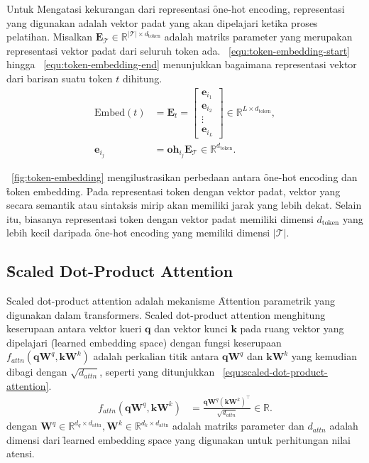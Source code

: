 	Untuk Mengatasi kekurangan dari representasi \f{one-hot encoding}, representasi yang digunakan adalah vektor padat yang akan dipelajari ketika proses pelatihan. Misalkan $\mathbf{E}_{\mathcal{T}} \in \mathbb{R}^{|\mathcal{T}| \times d_{\text{token}}}$ adalah matriks parameter yang merupakan representasi vektor padat dari seluruh token ada. \equ~\ref{equ:token-embedding-start} hingga \equ~\ref{equ:token-embedding-end} menunjukkan bagaimana representasi vektor dari barisan suatu token $t$ dihitung. 
	\begin{align}
		\label{equ:token-embedding-start}
		\text{Embed}(t) &= \mathbf{E}_{t} = \begin{bmatrix}
			\mathbf{e}_{i_1} \\
			\mathbf{e}_{i_2} \\
			\vdots \\
			\mathbf{e}_{i_L}
		\end{bmatrix} \in \mathbb{R}^{L \times d_{\text{token}}}, \\
		\mathbf{e}_{i_j} &= \mathbf{oh}_{i_j} \mathbf{E}_{\mathcal{T}} \in \mathbb{R}^{d_{\text{token}}}.
		\label{equ:token-embedding-end}
	\end{align}

	\pic~\ref{fig:token-embedding} mengilustrasikan perbedaan antara \f{one-hot encoding} dan \f{token embedding}. Pada representasi token dengan vektor padat, vektor yang secara semantik atau sintaksis mirip akan memiliki jarak yang lebih dekat. Selain itu, biasanya representasi token dengan vektor padat memiliki dimensi $d_{\text{token}}$ yang lebih kecil daripada \f{one-hot encoding} yang memiliki dimensi $|\mathcal{T}|$.

	\subsection{\f{Scaled Dot-Product Attention}}
	\label{sec:scaled-dot-product-attention}

	\f{Scaled dot-product attention} adalah mekanisme \f{Attention} parametrik yang digunakan dalam \f{transformers}. \f{Scaled dot-product attention} menghitung keserupaan antara vektor kueri $\mathbf{q}$ dan vektor kunci $\mathbf{k}$ pada ruang vektor yang dipelajari (\f{learned embedding space}) dengan fungsi keserupaan $f_{attn}(\mathbf{q} \mathbf{W}^q, \mathbf{k}\mathbf{W}^k) $ adalah perkalian titik antara $\mathbf{qW}^q$ dan $\mathbf{kW}^k$ yang kemudian dibagi dengan $\sqrt{d_{attn}}$, seperti yang ditunjukkan \equ~\ref{equ:scaled-dot-product-attention}.
	\begin{align}
		\label{equ:scaled-dot-product-attention}
		f_{attn}(\mathbf{q} \mathbf{W}^q, \mathbf{k} \mathbf{W}^k) &= \frac{\mathbf{q} \mathbf{W}^q (\mathbf{k} \mathbf{W}^k)^{\top}}{\sqrt{d_{attn}}} \in \mathbb{R}.
	\end{align}
	dengan $\mathbf{W}^q \in \mathbb{R}^{d_q \times d_{\text{attn}}}, \mathbf{W}^k \in \mathbb{R}^{d_k \times d_{\text{attn}}}$ adalah matriks parameter dan $d_{attn}$ adalah dimensi dari \f{learned embedding space} yang digunakan untuk perhitungan nilai atensi. 

